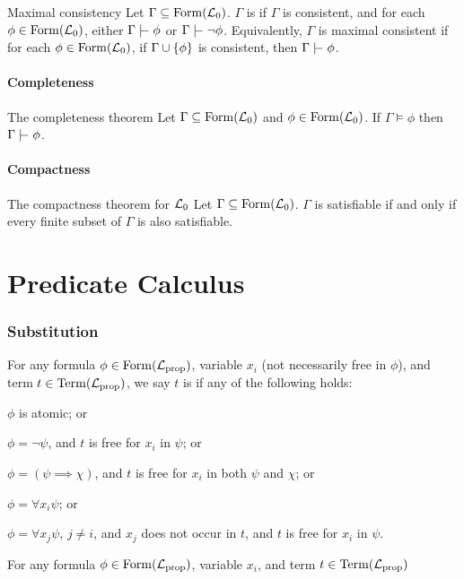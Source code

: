 \documentclass{styles/tufte}
\begin{document}
  \begin{definition}{Maximal consistency}{}
    Let $\Gamma \subseteq \operatorname{Form}(\mathcal{L}_0)$. $\Gamma$ is  if $\Gamma$ is consistent, and for each $\phi \in \operatorname{Form}(\mathcal{L}_0)$, either $\Gamma \proves \phi$ or $\Gamma \proves \neg\phi$. Equivalently, $\Gamma$ is maximal consistent if for each $\phi \in \operatorname{Form}(\mathcal{L}_0)$, if $\Gamma \cup \set{\phi}$ is consistent, then $\Gamma \proves \phi$.
  \end{definition}


\subsection{Completeness}
  
  \begin{theorem}{The completeness theorem}{}
    Let $\Gamma \subseteq \operatorname{Form}(\mathcal{L}_0)$ and $\phi \in \operatorname{Form}(\mathcal{L}_0)$. If $\Gamma \models \phi$ then $\Gamma \proves \phi$.
  \end{theorem}


\subsection{Compactness}
  
  \begin{theorem}{The compactness theorem for $\mathcal{L}_0$}{}
    Let $\Gamma \subseteq \operatorname{Form}(\mathcal{L}_0)$. $\Gamma$ is satisfiable if and only if every finite subset of $\Gamma$ is also satisfiable.
  \end{theorem}




\newpage
\part{Predicate Calculus}


\section{Substitution}

\begin{definition}{}{}
  For any formula $\phi \in \operatorname{Form}(\mathcal{L}_\textrm{prop})$, variable $x_i$ (not necessarily free in $\phi$), and term $t \in \operatorname{Term}(\mathcal{L}_\textrm{prop})$, we say $t$ is  if any of the following holds: %
  \begin{romanenum}
    \item $\phi$ is atomic; or
    \item $\phi = \neg\psi$, and $t$ is free for $x_i$ in $\psi$; or
    \item $\phi = (\psi \implies \chi)$, and $t$ is free for $x_i$ in both $\psi$ and $\chi$; or
    \item $\phi = \forall x_i \psi$; or
    \item $\phi = \forall x_j \psi$, $j \neq i$, and $x_j$ does not occur in $t$, and $t$ is free for $x_i$ in $\psi$.
  \end{romanenum}
\end{definition}

\begin{definition}{}{}
  For any formula $\phi \in \operatorname{Form}(\mathcal{L}_\textrm{prop})$, variable $x_i$, and term $t \in \operatorname{Term}(\mathcal{L}_\textrm{prop})$
\end{definition}


  

  
\end{document}
